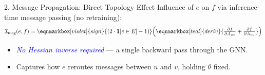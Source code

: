 \documentclass[aspectratio=169]{beamer}
\renewcommand{\emph}[1]{\textit{\textcolor{blue}{#1}}}
\begin{document}
\begin{frame}{2. Message Propagation: Direct Topology Effect}
    Influence of $e$ on $f$ via inference-time message passing (no retraining):
    \vspace{2em}
    \begin{equation}
        \mathcal{I}_{\text{msg}}(e, f) =
        \eqnmarkbox[violet]{sign}{(2 \cdot \mathbf{1}[e \in E] - 1)}
        \!\left(
        \eqnmarkbox[teal]{deriv}{\tfrac{\partial f}{\partial A_{uv}} + \tfrac{\partial f}{\partial A_{vu}}}
        \right)
    \end{equation}

    \vspace{1.5cm}
    \pause
    \begin{itemize}\setlength\itemsep{0.3em}
        \item \emph{No Hessian inverse required} --- a single backward pass through the GNN.
        \item Captures how $e$ reroutes messages between $u$ and $v$, holding $\theta$ fixed.
    \end{itemize}
\end{frame}



\end{document}
